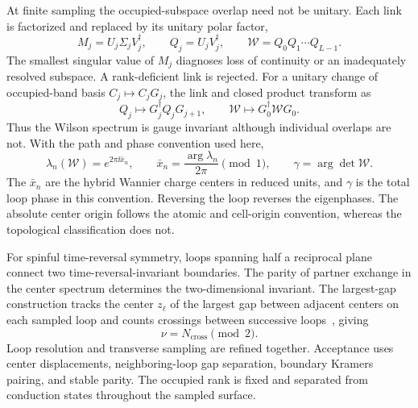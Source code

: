 At finite sampling the occupied-subspace overlap need not be unitary. Each
link is factorized and replaced by its unitary polar factor,
\begin{equation}
 M_j=U_j\Sigma_j V_j^\dagger,\qquad
 Q_j=U_jV_j^\dagger,\qquad
 \mathcal W=Q_0Q_1\cdots Q_{L-1}.
 \label{eq:topology-wilson}
\end{equation}
The smallest singular value of $M_j$ diagnoses loss of continuity or an
inadequately resolved subspace. A rank-deficient link is rejected. For a
unitary change of occupied-band basis $C_j\mapsto C_jG_j$, the link and
closed product transform as
\begin{equation}
 Q_j\mapsto G_j^\dagger Q_jG_{j+1},\qquad
 \mathcal W\mapsto G_0^\dagger\mathcal W G_0 .
 \label{eq:topology-gauge}
\end{equation}
Thus the Wilson spectrum is gauge invariant although individual overlaps
are not. With the path and phase convention used here,
\begin{equation}
 \lambda_n(\mathcal W)=e^{2\pi\ii\bar x_n},\qquad
 \bar x_n=\frac{\arg\lambda_n}{2\pi}\pmod 1,\qquad
 \gamma=\arg\det\mathcal W .
 \label{eq:topology-centers}
\end{equation}
The $\bar x_n$ are the hybrid Wannier charge centers in reduced units,
and $\gamma$ is the total loop phase in this convention. Reversing the loop
reverses the eigenphases. The absolute center origin follows the atomic and
cell-origin convention, whereas the topological classification does not.

For spinful time-reversal symmetry, loops spanning half a reciprocal plane
connect two time-reversal-invariant boundaries. The parity of partner
exchange in the center spectrum determines the two-dimensional invariant.
The largest-gap construction tracks the center $z_\ell$ of the largest
gap between adjacent centers on each sampled loop and counts crossings
between successive loops~\cite{Soluyanov2011,Gresch2017}, giving
\begin{equation}
 \nu=N_{\mathrm{cross}}\pmod 2 .
 \label{eq:topology-z2}
\end{equation}
Loop resolution and transverse sampling are refined together. Acceptance
uses center displacements, neighboring-loop gap separation, boundary
Kramers pairing, and stable parity. The occupied rank is fixed and separated
from conduction states throughout the sampled surface.

